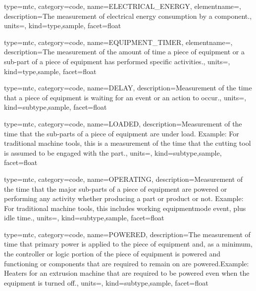 {
  type=mtc,
  category=code,
  name={ELECTRICAL\_ENERGY},
  elementname=,
  description={The measurement of electrical energy consumption by a component.},
  units=,
  kind={type,sample},
  facet={\gls{float}}
}


{
  type=mtc,
  category=code,
  name={EQUIPMENT\_TIMER},
  elementname=,
  description={The measurement of the amount of time a piece of equipment or a sub-part of a piece of equipment has performed specific activities.},
  units=,
  kind={type,sample},
  facet={\gls{float}}
}


{
  type=mtc,
  category=code,
  name={DELAY},
  description={Measurement of the time that a piece of equipment is waiting for an event or an action to occur.},
  units=,
  kind={subtype,sample},
  facet={\gls{float}}
}


{
  type=mtc,
  category=code,
  name={LOADED},
  description={Measurement of the time that the sub-parts of a piece of equipment are under load. \newline Example: For traditional machine tools, this is a measurement of the time that the cutting tool is assumed to be engaged with the part.},
  units=,
  kind={subtype,sample},
  facet={\gls{float}}
}


{
  type=mtc,
  category=code,
  name={OPERATING},
  description={Measurement of the time that the major sub-parts of a piece of equipment are powered or performing any activity whether producing a part or product or not.   \newline Example: For traditional machine tools, this includes \gls{working equipmentmode event}, plus idle time.},
  units=,
  kind={subtype,sample},
  facet={\gls{float}}
}


{
  type=mtc,
  category=code,
  name={POWERED},
  description={The measurement of time that primary power is applied to the piece of equipment and, as a minimum, the controller or logic portion of the piece of equipment is powered and functioning or components that are required to remain on are powered.Example: Heaters for an extrusion machine that are required to be powered even when the equipment is turned off.},
  units=,
  kind={subtype,sample},
  facet={\gls{float}}
}


